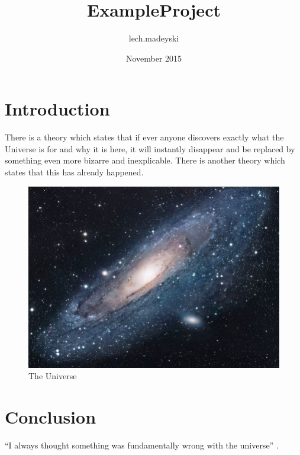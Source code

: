 \documentclass{article}
\title{ExampleProject}
\author{lech.madeyski }
\date{November 2015}
\begin{document}
\maketitle

\section{Introduction}
There is a theory which states that if ever anyone discovers exactly what the Universe is for and why it is here, it will instantly disappear and be replaced by something even more bizarre and inexplicable.
There is another theory which states that this has already happened.

\begin{figure}[h!]
\centering
\includegraphics[scale=1.7]{images/test.jpg}
\caption{The Universe}
\label{fig:univerise}
\end{figure}

\section{Conclusion}
``I always thought something was fundamentally wrong with the universe'' \citep{Adams95}.



\end{document}
